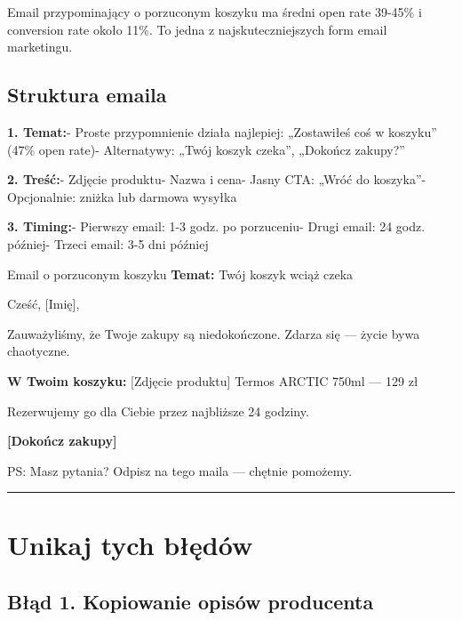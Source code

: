 \documentclass[
  12pt,
  a4paper,
  twoside,
  openright,
  12pt,
  DIV=12,
  BCOR=12mm]{scrbook}
\newcommand{\decoline}{%
  \begin{center}
    \textcolor{bordergray}{\rule{0.3\textwidth}{0.5pt}}
  \end{center}
}
\begin{document}
Email przypominający o porzuconym koszyku ma średni open rate 39-45\% i
conversion rate około 11\%. To jedna z najskuteczniejszych form email
marketingu.

\subsection{Struktura emaila}\label{struktura-emaila}

\textbf{1. Temat:}\newline - Proste przypomnienie działa najlepiej:
„Zostawiłeś coś w koszyku'' (47\% open rate)\newline - Alternatywy:
„Twój koszyk czeka'', „Dokończ zakupy?''

\textbf{2. Treść:}\newline - Zdjęcie produktu\newline - Nazwa i
cena\newline - Jasny CTA: „Wróć do koszyka''\newline - Opcjonalnie:
zniżka lub darmowa wysyłka

\textbf{3. Timing:}\newline - Pierwszy email: 1-3 godz. po
porzuceniu\newline - Drugi email: 24 godz. później\newline - Trzeci
email: 3-5 dni później

\begin{przyklad}{Email o porzuconym koszyku}
\textbf{Temat:} Twój koszyk wciąż czeka

Cześć, [Imię],

Zauważyliśmy, że Twoje zakupy są niedokończone. Zdarza się --- życie bywa chaotyczne.

\textbf{W Twoim koszyku:}
[Zdjęcie produktu]
Termos ARCTIC 750ml --- 129 zł

Rezerwujemy go dla Ciebie przez najbliższe 24 godziny.

\textbf{[Dokończ zakupy]}

PS: Masz pytania? Odpisz na tego maila --- chętnie pomożemy.
\end{przyklad}

\decoline

\section{Unikaj tych błędów}\label{unikaj-tych-bux142ux119duxf3w}

\subsection{Błąd 1. Kopiowanie opisów
producenta}\label{bux142ux105d-1.-kopiowanie-opisuxf3w-producenta}
\end{document}
